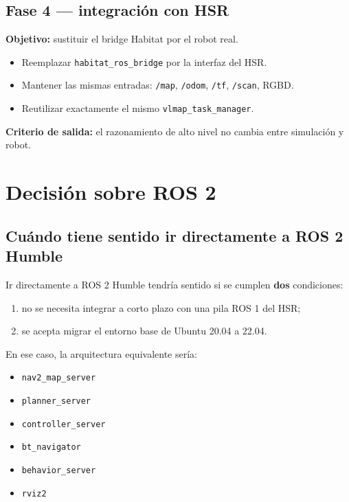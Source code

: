 \documentclass[11pt,a4paper]{article}
\begin{document}
\subsection{Fase 4 --- integración con HSR}

\textbf{Objetivo:} sustituir el bridge Habitat por el robot real.

\begin{itemize}
  \item Reemplazar \texttt{habitat\_ros\_bridge} por la interfaz del HSR.
  \item Mantener las mismas entradas:
        \texttt{/map}, \texttt{/odom}, \texttt{/tf}, \texttt{/scan}, RGBD.
  \item Reutilizar exactamente el mismo \texttt{vlmap\_task\_manager}.
\end{itemize}

\textbf{Criterio de salida:} el razonamiento de alto nivel no cambia entre
simulación y robot.

\section{Decisión sobre ROS 2}

\subsection{Cuándo tiene sentido ir directamente a ROS 2 Humble}

Ir directamente a ROS 2 Humble tendría sentido si se cumplen \textbf{dos}
condiciones:

\begin{enumerate}
  \item no se necesita integrar a corto plazo con una pila ROS 1 del HSR;
  \item se acepta migrar el entorno base de Ubuntu 20.04 a 22.04.
\end{enumerate}

En ese caso, la arquitectura equivalente sería:

\begin{itemize}
  \item \texttt{nav2\_map\_server}
  \item \texttt{planner\_server}
  \item \texttt{controller\_server}
  \item \texttt{bt\_navigator}
  \item \texttt{behavior\_server}
  \item \texttt{rviz2}
\end{itemize}
\end{document}
